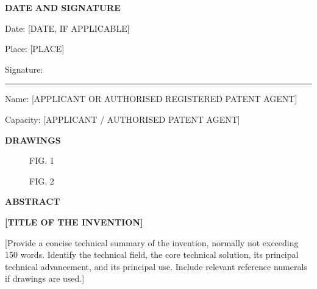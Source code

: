 \documentclass[12pt,a4paper]{article}
\newcommand{\InventionTitle}
{[TITLE OF THE INVENTION]}
\newcommand{\FilingDate}
{[DATE, IF APPLICABLE]}
\begin{document}
\newpage

\textbf{DATE AND SIGNATURE}

Date: \FilingDate

Place: [PLACE]

Signature: \rule{55mm}{0.4pt}

Name: [APPLICANT OR AUTHORISED REGISTERED PATENT AGENT]

Capacity: [APPLICANT / AUTHORISED PATENT AGENT]


\newpage

\begin{center}
    \textbf{\Large DRAWINGS}
\end{center}


\begin{figure}[H]
    \centering
    \caption*{FIG. 1}
\end{figure}

\begin{figure}[H]
    \centering
    \caption*{FIG. 2}
\end{figure}



\newpage

\begin{center}
    \textbf{\Large ABSTRACT}
\end{center}

\textbf{\InventionTitle}

[Provide a concise technical summary of the invention,
normally not exceeding 150 words. Identify the technical
field, the core technical solution, its principal
technical advancement, and its principal use. Include
relevant reference numerals if drawings are used.]
\end{document}
